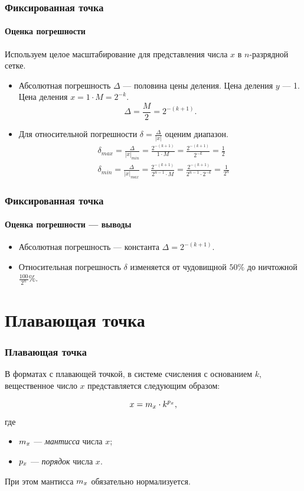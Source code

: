 \begin{frame}
    \frametitle{Фиксированная точка}
    \framesubtitle{Оценка погрешности}

    Используем целое масштабирование для представления числа $x$ в $n$-разрядной сетке.
    \begin{itemize}
        \item Абсолютная погрешность $\Delta$ --- половина цены деления. Цена деления $y$ --- 1. Цена деления $x=1\cdot M=2^{-k}$.
        \[
            \Delta=\frac{M}{2}=2^{-(k+1)}.
        \]
        
        \item Для относительной погрешности $\delta=\frac{\Delta}{|x|}$ оценим диапазон.
        \begin{align*}
            &\delta_{max}=\frac{\Delta}{|x|_{min}}=\frac{2^{-(k+1)}}{1\cdot M}=\frac{2^{-(k+1)}}{2^{-k}}=\frac{1}{2} \\
            &\delta_{min}=\frac{\Delta}{|x|_{max}}=\frac{2^{-(k+1)}}{2^{n-1}\cdot M}=\frac{2^{-(k+1)}}{2^{n-1}\cdot 2^{-k}}=\frac{1}{2^n} 
        \end{align*}
    \end{itemize}
\end{frame}

\begin{frame}
    \frametitle{Фиксированная точка}
    \framesubtitle{Оценка погрешности --- выводы}

    \begin{itemize}
        \item Абсолютная погрешность --- константа $\Delta=2^{-(k+1)}$.
        
        \item Относительная погрешность $\delta$ изменяется от чудовищной $50\%$ до ничтожной $\frac{100}{2^n}\%$.
    \end{itemize}
\end{frame}


\section{Плавающая точка}


\begin{frame}
    \frametitle{Плавающая точка}

    В форматах с плавающей точкой, в системе счисления с основанием $k$, вещественное число $x$ представляется следующим образом:
    
    \[x = m_{x}\cdot {k}^{p_{x}},\]
    где 
    \begin{block}{}
        \begin{itemize}
            \item $m_{x}$ --- \emph{мантисса} числа $x$;
            \item $p_{x}$ --- \emph{порядок} числа $x$.
        \end{itemize}
    \end{block}
    
    При этом мантисса $m_{x}$ обязательно нормализуется. 
\end{frame}

